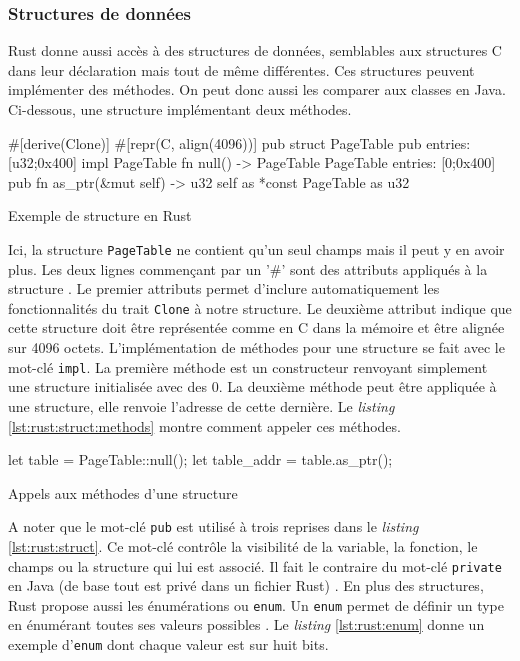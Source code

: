 
\subsubsection{Structures de données}
Rust donne aussi accès à des structures de données, semblables aux structures
C dans leur déclaration mais tout de même différentes. Ces structures peuvent
implémenter des méthodes. On peut donc aussi les comparer aux classes en Java.
Ci-dessous, une structure implémentant deux méthodes.

\begin{code}
\begin{rustcode}
#[derive(Clone)]
#[repr(C, align(4096))]
pub struct PageTable {
    pub entries: [u32;0x400]
}
impl PageTable {
    fn null() -> PageTable {
        PageTable {
            entries: [0;0x400]
        }
    }
    pub fn as_ptr(&mut self) -> u32 {
        self as *const PageTable as u32
    }
}
\end{rustcode}
\caption{Exemple de structure en Rust}
\label{lst:rust:struct}
\end{code} \bigbreak

Ici, la structure \texttt{PageTable} ne contient qu'un seul champs
mais il peut y en avoir plus. Les deux lignes commençant par un '\#' sont des attributs
appliqués à la structure \cite{ref2}. Le premier attributs permet d'inclure automatiquement
les fonctionnalités du trait \texttt{Clone} à notre structure. Le deuxième attribut
indique que cette structure doit être représentée comme en C dans la mémoire et
être alignée sur 4096 octets. L'implémentation de méthodes pour une structure se
fait avec le mot-clé \texttt{impl}. La première méthode est un constructeur
renvoyant simplement une structure initialisée avec des 0. La deuxième méthode peut
être appliquée à une structure, elle renvoie l'adresse de cette dernière. Le \textit{listing}
\ref{lst:rust:struct:methods} montre comment appeler ces méthodes.

\begin{code}
\begin{rustcode}
let table = PageTable::null();
let table_addr = table.as_ptr();
\end{rustcode}
\caption{Appels aux méthodes d'une structure}
\label{lst:rust:struct:methods}
\end{code} \bigbreak

A noter que le mot-clé \texttt{pub} est utilisé à trois reprises dans
le \textit{listing} \ref{lst:rust:struct}. Ce mot-clé contrôle la visibilité de
la variable, la fonction, le champs ou la structure qui lui est associé. Il fait
le contraire du mot-clé \texttt{private} en Java (de base tout est privé
dans un fichier Rust) \cite{ref2}. En plus des structures, Rust propose aussi
les énumérations ou \texttt{enum}. Un \texttt{enum} permet
de définir un type en énumérant toutes ses valeurs possibles \cite{ref2}. Le
\textit{listing} \ref{lst:rust:enum} donne un exemple d'\texttt{enum}
dont chaque valeur est sur huit bits.

